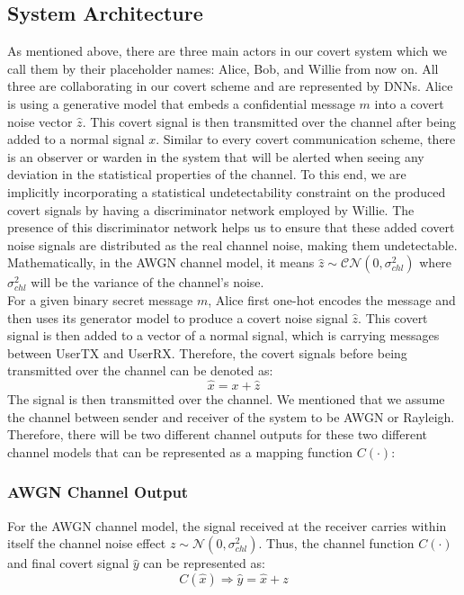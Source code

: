 \subsection{System Architecture}
As mentioned above, there are three main actors in our covert system which we call them by their placeholder names: Alice, Bob, and Willie from now on. All three are collaborating in our covert scheme and are represented by DNNs. Alice is using a generative model that embeds a confidential message \(m\) into a covert noise vector \(\hat{z}\). This covert signal is then transmitted over the channel after being added to a normal signal \(x\). Similar to every covert communication scheme, there is an observer or warden in the system that will be alerted when seeing any deviation in the statistical properties of the channel. To this end, we are implicitly incorporating a statistical undetectability constraint on the produced covert signals by having a discriminator network employed by Willie. The presence of this discriminator network helps us to ensure that these added covert noise signals are distributed as the real channel noise, making them undetectable. Mathematically, in the AWGN channel model, it means \(\hat{z} \sim \mathcal{CN}(0, \sigma_{chl}^2)\) where \(\sigma_{chl}^2\) will be the variance of the channel's noise.\\
For a given binary secret message \(m\), Alice first one-hot encodes the message and then uses its generator model to produce a covert noise signal \(\hat{z}\). This covert signal is then added to a vector of a normal signal, which is carrying messages between UserTX and UserRX. Therefore, the covert signals before being transmitted over the channel can be denoted as:
\begin{equation}
	\hat{x} = x + \hat{z}
\end{equation}
The signal is then transmitted over the channel. We mentioned that we assume the channel between sender and receiver of the system to be AWGN or Rayleigh. Therefore, there will be two different channel outputs for these two different channel models that can be represented as a mapping function \(C(\cdot)\):
\subsubsection{AWGN Channel Output}
For the AWGN channel model, the signal received at the receiver carries within itself the channel noise effect \(z \sim \mathcal{N}(0, \sigma_{chl}^2)\). Thus, the channel function \(C(\cdot)\) and final covert signal \(\hat{y}\) can be represented as:
\begin{equation}
	C(\hat{x}) \Rightarrow \hat{y} = \hat{x} + z
\end{equation}
